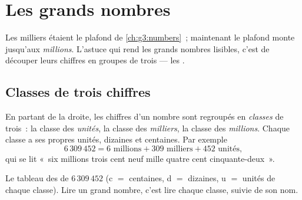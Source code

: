 \chapter{Les grands nombres}\label{ch:g4:numbers}

Les milliers étaient le plafond de \cref{ch:g3:numbers}~; maintenant
le plafond monte jusqu'aux \emph{millions}. L'astuce qui rend les
grands nombres lisibles, c'est de découper leurs chiffres en groupes
de trois --- les .

\section{Classes de trois chiffres}

\begin{definition}[Classes]\label{def:g4:numbers:classes}
En partant de la droite, les chiffres d'un nombre sont regroupés en
\emph{classes} de trois~: la classe des \emph{unités}, la classe des
\emph{milliers}, la classe des \emph{millions}. Chaque classe a ses
propres unités, dizaines et centaines. Par exemple
\[
6\,309\,452 = 6 \text{ millions} + 309 \text{ milliers}
+ 452 \text{ unités},
\]
qui se lit «~six millions trois cent neuf mille quatre cent
cinquante-deux~».
\end{definition}

\begin{omfigure}

{\small Le tableau des  de $6\,309\,452$ (c $=$ centaines, d $=$
dizaines, u $=$ unités de chaque classe). Lire un grand nombre, c'est
lire chaque classe, suivie de son nom.}
\end{omfigure}

